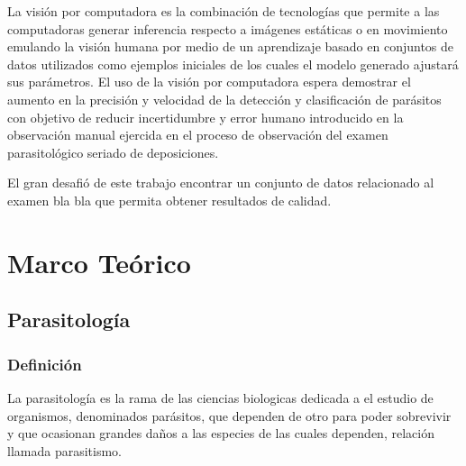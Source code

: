 \documentclass[letter,12pt]{report}
\begin{document}


    La visión por computadora es la combinación de tecnologías que permite a las
    computadoras generar inferencia respecto a imágenes estáticas o en movimiento
    emulando la visión humana por medio de un aprendizaje basado en conjuntos de datos
    utilizados como ejemplos iniciales de los cuales el modelo generado ajustará sus
    parámetros. %
    El uso de la visión por computadora espera demostrar el aumento en la precisión y
    velocidad de la detección y clasificación de parásitos con objetivo de reducir
    incertidumbre y error humano introducido en la observación manual ejercida en el proceso
    de observación del examen parasitológico seriado de deposiciones. 


    El gran desafió de este trabajo encontrar un conjunto de datos relacionado al examen
    bla bla que permita obtener resultados de calidad.


\chapter{Marco Teórico}\label{teorico}

\section{Parasitología}
\subsection{Definición}
La parasitología \cite{c02} es la rama de las ciencias biologicas dedicada a el estudio de
organismos, denominados parásitos, que dependen de otro para poder sobrevivir y que
ocasionan grandes daños a las especies de las cuales dependen, relación llamada
parasitismo.
\end{document}
